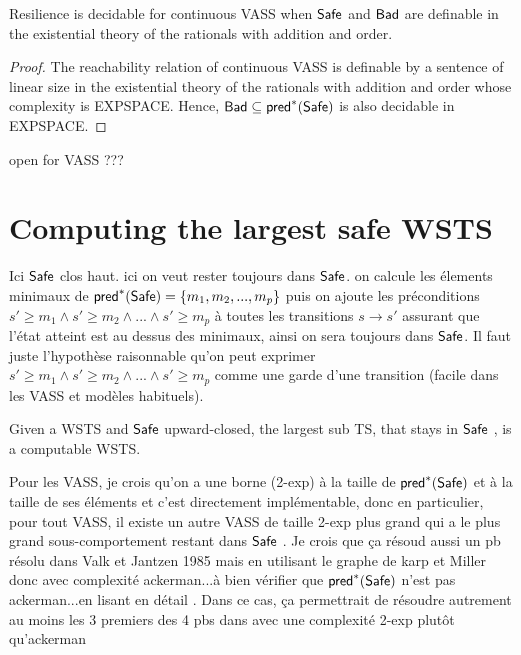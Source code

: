 \begin{theorem}{}
Resilience is decidable for continuous VASS when $\textsf{Safe}$ and $\textsf{Bad}$ are definable in the existential theory of
the rationals with addition and order.
\end{theorem}


\begin{proof}
The reachability relation of continuous VASS is definable by a sentence of linear size in the existential theory of
the rationals with addition and order whose complexity is EXPSPACE. Hence, $\textsf{Bad} \subseteq \textsf{pred}^*(\textsf{Safe})$ is also decidable in EXPSPACE. 
\end{proof}


open for VASS ???

\section{Computing the largest safe WSTS}

Ici $\textsf{Safe}$ clos haut. ici on veut rester toujours dans $\textsf{Safe}$. on calcule les élements minimaux de $\textsf{pred}^*(\textsf{Safe})=\{m_1,m_2,...,m_p\}$ puis on ajoute les préconditions $s' \geq m_1  	\wedge s' \geq m_2  	\wedge...	\wedge s' \geq m_p$ à toutes les transitions $s \rightarrow s'$ assurant que l'état atteint est au dessus des minimaux, ainsi on sera toujours dans $\textsf{Safe}$. Il faut juste l'hypothèse raisonnable qu'on peut exprimer $s' \geq m_1  	\wedge s' \geq m_2  	\wedge...	\wedge s' \geq m_p$ comme une garde d'une transition (facile dans les VASS et modèles habituels).

\begin{theorem}{}
Given a WSTS and $\textsf{Safe}$  upward-closed, the largest sub TS, that stays in $\textsf{Safe}$ , is a computable WSTS.
\end{theorem}

Pour les VASS, je crois qu'on a une borne (2-exp) à la taille de $\textsf{pred}^*(\textsf{Safe})$ et à la taille de ses éléments \cite{DBLP:conf/rp/BozzelliG11} et c'est directement implémentable, donc en particulier, pour tout VASS, il existe un autre VASS de taille 2-exp plus grand qui a le plus grand sous-comportement restant dans $\textsf{Safe}$ .
Je crois que ça résoud aussi un pb résolu dans Valk et Jantzen 1985 \cite{DBLP:journals/acta/ValkJ85} mais en utilisant le graphe de karp et Miller donc avec complexité ackerman...à bien vérifier que $\textsf{pred}^*(\textsf{Safe})$ n'est pas ackerman...en lisant en détail \cite{DBLP:conf/rp/BozzelliG11}. Dans ce cas, ça permettrait de résoudre autrement au moins les 3 premiers des 4 pbs dans \cite{DBLP:journals/acta/ValkJ85} avec une complexité 2-exp plutôt qu'ackerman 

